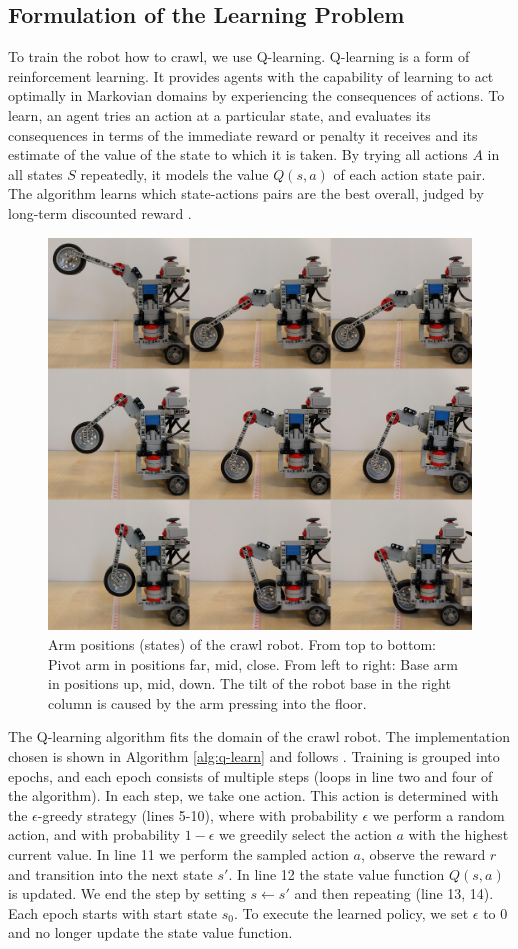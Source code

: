 \documentclass[11pt, a4paper]{article}
\begin{document}
	\subsection{Formulation of the Learning Problem}
	To train the robot how to crawl, we use Q-learning. Q-learning is a form of reinforcement learning. It provides agents with the capability of learning to act optimally in Markovian domains by experiencing the consequences of actions. To learn, an agent tries an action at a particular state, and evaluates its consequences in terms of the immediate reward or penalty it receives and its estimate of the value of the state to which it is taken. By trying all actions $A$ in all states $S$ repeatedly, it models the value $Q(s,a)$ of each action state pair. The algorithm learns which state-actions pairs are the best overall, judged by long-term discounted reward \cite{Watkins1992}.
	
	\begin{figure}
		\centering
		\includegraphics[width=0.6\linewidth]{images/crawl_states}
		\caption{Arm positions (states) of the crawl robot. From top to bottom: Pivot arm in positions far, mid, close. From left to right: Base arm in positions up, mid, down. The tilt of the robot base in the right column is caused by the arm pressing into the floor.}
		\label{fig:crawl_states}
	\end{figure}
	\medskip
	The Q-learning algorithm fits the domain of the crawl robot. The implementation chosen is shown in Algorithm \ref{alg:q-learn} and follows \cite{sutton1998introduction}. Training is grouped into epochs, and each epoch consists of multiple steps (loops in line two and four of the algorithm). In each step, we take one action. This action is determined with the $\epsilon$-greedy strategy (lines 5-10), where with probability $\epsilon$ we perform a random action, and with probability $1-\epsilon$ we greedily select the action $a$ with the highest current value. In line 11 we perform the sampled action $a$, observe the reward $r$ and transition into the next state $s'$. In line 12 the state value function $Q(s,a)$ is updated. We end the step by setting $s \leftarrow s'$ and then repeating (line 13, 14). Each epoch starts with start state $s_0$. To execute the learned policy, we set $\epsilon$ to $0$ and no longer update the state value function.
	\medskip
	
\end{document}
